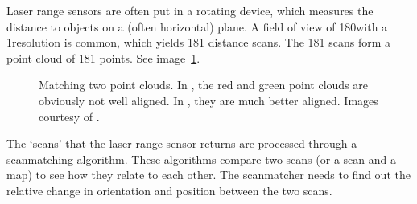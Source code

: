 Laser range sensors are often put in a rotating device, which measures the distance to objects on a (often horizontal) plane. A field of view of 180\degree with a 1\degree resolution is common, which yields 181 distance scans. The 181 scans form a point cloud of 181 points. See image~\ref{fig:slamet41}.

\begin{figure}[ht]
\centering
{}
\caption{Matching two point clouds. In , the red and green point clouds are obviously not well aligned. In , they are much better aligned. Images courtesy of \cite{slamet2006manifoldslam}.}
\label{fig:slamet41}
\end{figure} 

The `scans' that the laser range sensor returns are processed through a scanmatching algorithm. These algorithms compare two scans (or a scan and a map) to see how they relate to each other. The scanmatcher needs to find out the relative change in orientation and position between the two scans.

